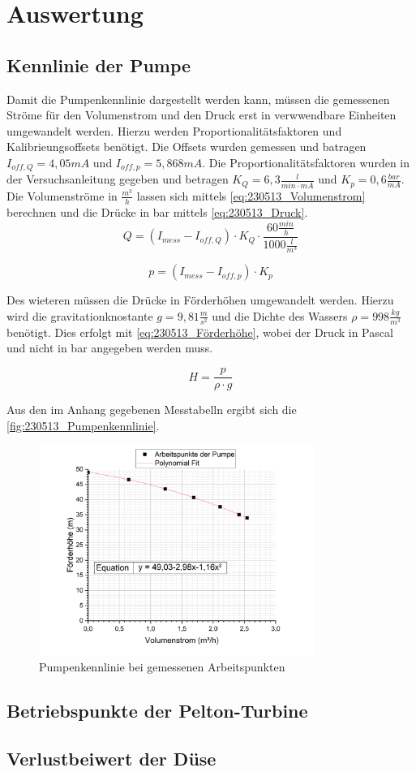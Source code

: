 \section{Auswertung}
\subsection{Kennlinie der Pumpe}
Damit die Pumpenkennlinie dargestellt werden kann, müssen die gemessenen Ströme für den Volumenstrom und den Druck erst in verwwendbare Einheiten umgewandelt werden. 
Hierzu werden Proportionalitätsfaktoren und Kalibrieungsoffsets benötigt. 
Die Offsets wurden gemessen und batragen $I_{off,Q}=4,05 mA$ und $I_{off,p}=5,868 mA$.
Die Proportionalitätsfaktoren wurden in der Versuchsanleitung gegeben und betragen $K_Q = 6,3 \frac{l}{min \cdot mA}$ und $K_p = 0,6 \frac{bar}{mA}$.
Die Volumenströme in $\frac{m^3}{h}$ lassen sich mittels \autoref{eq:230513_Volumenstrom} berechnen und die Drücke in bar mittels \autoref{eq:230513_Druck}.
\begin{equation}
  Q = (I_{mess}-I_{off,Q})\cdot K_Q \cdot \frac{60\frac{min}{h}}{1000\frac{l}{m^3}}
  \label{eq:230513_Volumenstrom}
\end{equation}

\begin{equation}
  p = (I_{mess}-I_{off,p})\cdot K_p
  \label{eq:230513_Druck}
\end{equation}

Des wieteren müssen die Drücke in Förderhöhen umgewandelt werden. Hierzu wird die gravitationknostante $g = 9,81 \frac{m}{s^2}$ und die Dichte des Wassers $\rho = 998 \frac{kg}{m^3}$ benötigt.
Dies erfolgt mit \autoref{eq:230513_Förderhöhe}, wobei der Druck in Pascal und nicht in bar angegeben werden muss.

\begin{equation}
  H = \frac{p}{\rho \cdot g}
  \label{eq:230513_Förderhöhe}
\end{equation}

Aus den im Anhang gegebenen Messtabelln ergibt sich die \autoref{fig:230513_Pumpenkennlinie}.
\begin{figure}[!ht]
  \centering
  \includegraphics[width=0.8\textwidth]{Abbildungen/Pumpenkennlinie.png}
  \caption{Pumpenkennlinie bei gemessenen Arbeitspunkten}
  \label{fig:230513_Pumpenkennlinie}
\end{figure}

\subsection{Betriebspunkte der Pelton-Turbine}
\subsection{Verlustbeiwert der Düse}